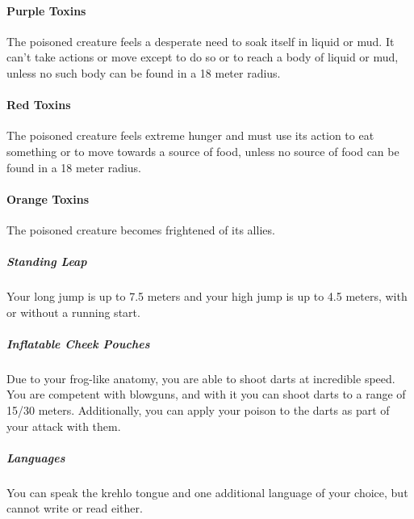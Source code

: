         \paragraph{Purple Toxins} The poisoned creature feels a desperate need to soak itself in liquid or mud.
        It can't take actions or move except to do so or to reach a body of liquid or mud, unless no such body can be found in a 18 meter radius.

        \paragraph{Red Toxins} The poisoned creature feels extreme hunger and must use its action to eat something or to move towards a source of food, unless no source of food can be found in a 18 meter radius.

        \paragraph{Orange Toxins} The poisoned creature becomes frightened of its allies.


    \subparagraph{Standing Leap} Your long jump is up to 7.5 meters and your high jump is up to 4.5 meters, with or without a running start.


    \subparagraph{Inflatable Cheek Pouches} Due to your frog-like anatomy, you are able to shoot darts at incredible speed.
    You are competent with blowguns, and with it you can shoot darts to a range of 15/30 meters.
    Additionally, you can apply your poison to the darts as part of your attack with them.


    \subparagraph{Languages} You can speak the krehlo tongue and one additional language of your choice, but cannot write or read either.

